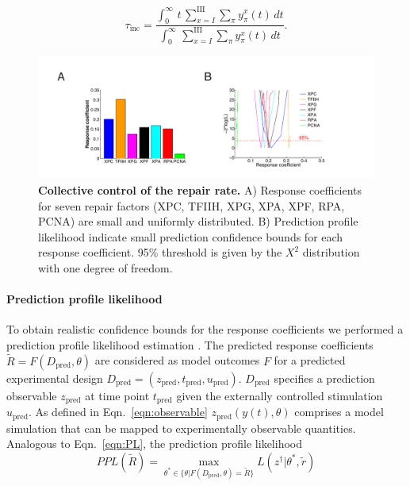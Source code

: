 \begin{equation}
\tau_{\text{inc}}=\frac{\int^\infty_0 \,t \,\sum_{x=I}^{\text{III}} \sum_ \pi  y_\pi^x(t)\,dt}{\int^\infty_0  \,\sum_{x=I}^{\text{III}} \sum_ \pi  y_\pi^x(t)\,dt}.
\end{equation}    



\begin{figure}[htbp]
	\begin{center}
		\includegraphics[width=1\textwidth]{Abbildungen/figure3_1.pdf}
		\caption{\textbf{Collective control of the repair rate.} A) Response coefficients for seven repair factors (XPC, TFIIH, XPG, XPA, XPF, RPA, PCNA) are small and uniformly distributed. B) Prediction profile likelihood indicate small prediction confidence bounds for each response coefficient. 95\% threshold is given by the $X^2$ distribution with one degree of freedom.}
		\label{fig:controlCoefficients}
	\end{center}
\end{figure}

\paragraph{Prediction profile likelihood}
To obtain realistic confidence bounds for the response coefficients we performed a prediction profile likelihood estimation \cite{Kreutz2012,Hinkley1979}. The predicted response coefficients $\tilde{R} = F(D_{\text{pred}},\theta)$ are considered as model outcomes $F$ for a predicted experimental design $D_{\text{pred}}= (z_{\text{pred}},t_{\text{pred}},u_{\text{pred}})$. $D_{\text{pred}}$ specifies a prediction observable $z_{\text{pred}}$ at time point $t_{\text{pred}}$ given the externally controlled stimulation $u_{\text{pred}}$. As defined in Eqn.\ \ref{eqn:observable} $z_{\text{pred}}(y(t),\theta)$ comprises a model simulation that can be mapped to experimentally observable quantities. Analogous to Eqn.\ \ref{eqn:PL}, the prediction profile likelihood 
\begin{equation}
PPL(\tilde{R}) = \max_{\theta^\ast \in \{\theta \lvert F(D_{\text{pred}},\theta)=\tilde{R}\}} L(z^\dag \lvert \theta^\ast,\tilde{r}) 
\end{equation}   

